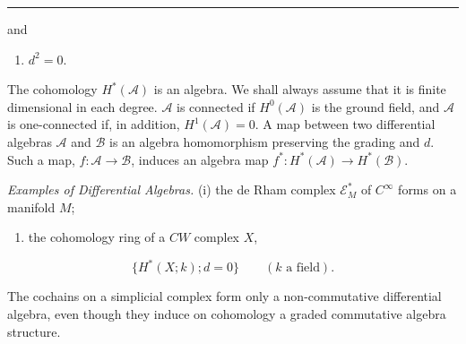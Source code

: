 \documentclass[
  english,
  a3paper,
  a3paper]{extarticle}
\providecommand{\tightlist}{%
  \setlength{\itemsep}{0pt}\setlength{\parskip}{0pt}}
\begin{document}
\par

\vspace{0.7mm}\hrule\vspace{1.6mm}

\fontsize{9}{11}\selectfont

and

\begin{enumerate}
\def\labelenumi{\arabic{enumi})}
\setcounter{enumi}{2}
\tightlist
\item
  \(d^2=0\).
\end{enumerate}

The cohomology \(H^*(\mathscr A)\) is an algebra. We shall always assume
that it is finite dimensional in each degree. \(\mathscr A\) is
connected if \(H^0(\mathscr A)\) is the ground field, and \(\mathscr A\)
is one-connected if, in addition, \(H^1(\mathscr A)=0\). A map between
two differential algebras \(\mathscr A\) and \(\mathscr B\) is an
algebra homomorphism preserving the grading and \(d\). Such a map,
\(f:\mathscr A\to\mathscr B\), induces an algebra map
\(f^*:H^*(\mathscr A)\to H^*(\mathscr B)\).

\emph{Examples of Differential Algebras.} (i) the de Rham complex
\(\mathscr E_M^*\) of \(C^\infty\) forms on a manifold \(M\);

\begin{enumerate}
\def\labelenumi{(\roman{enumi})}
\setcounter{enumi}{1}
\tightlist
\item
  the cohomology ring of a \(CW\) complex \(X\),
\end{enumerate}

\[
\{H^*(X;k);d=0\}\qquad(k\text{ a field}).
\]

The cochains on a simplicial complex form only a non-commutative
differential algebra, even though they induce on cohomology a graded
commutative algebra structure.
\end{document}
